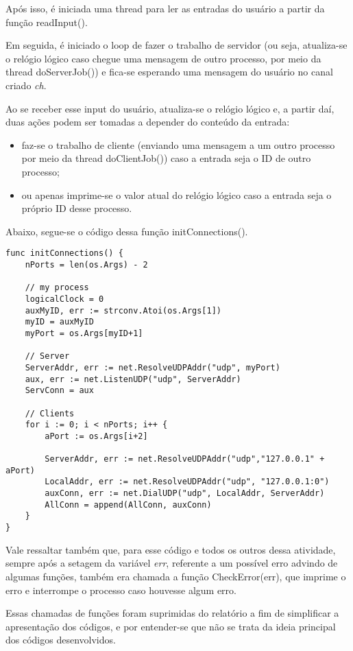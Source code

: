 \documentclass[conference]{IEEEtran}
\begin{document}
	Após isso, é iniciada uma thread para ler as entradas do usuário a partir da função readInput().
	
	Em seguida, é iniciado o loop de fazer o trabalho de servidor (ou seja, atualiza-se o relógio lógico caso chegue uma mensagem de outro processo, por meio da thread doServerJob()) e fica-se esperando uma mensagem do usuário no canal criado \textit{ch}.
	
	Ao se receber esse input do usuário, atualiza-se o relógio lógico e, a partir daí, duas ações podem ser tomadas a depender do conteúdo da entrada: 
	
\begin{itemize}
\item faz-se o trabalho de cliente (enviando uma mensagem a um outro processo por meio da thread doClientJob()) caso a entrada seja o ID de outro processo;
\item ou apenas imprime-se o valor atual do relógio lógico caso a entrada seja o próprio ID desse processo.
\end{itemize}
	
	Abaixo, segue-se o código dessa função initConnections().
	
\begin{lstlisting}
func initConnections() {
	nPorts = len(os.Args) - 2

	// my process
	logicalClock = 0
	auxMyID, err := strconv.Atoi(os.Args[1])
	myID = auxMyID
	myPort = os.Args[myID+1]

	// Server
	ServerAddr, err := net.ResolveUDPAddr("udp", myPort)
	aux, err := net.ListenUDP("udp", ServerAddr)
	ServConn = aux

	// Clients
	for i := 0; i < nPorts; i++ {
		aPort := os.Args[i+2]
		
		ServerAddr, err := net.ResolveUDPAddr("udp","127.0.0.1" + aPort)
		LocalAddr, err := net.ResolveUDPAddr("udp", "127.0.0.1:0")
		auxConn, err := net.DialUDP("udp", LocalAddr, ServerAddr)
		AllConn = append(AllConn, auxConn)
	}
}
\end{lstlisting}

	Vale ressaltar também que, para esse código e todos os outros dessa atividade, sempre após a setagem da variável \textit{err}, referente a um possível erro advindo de algumas funções, também era chamada a função CheckError(err), que imprime o erro e interrompe o processo caso houvesse algum erro.
	
	Essas chamadas de funções foram suprimidas do relatório a fim de simplificar a apresentação dos códigos, e por entender-se que não se trata da ideia principal dos códigos desenvolvidos.
	
\end{document}
